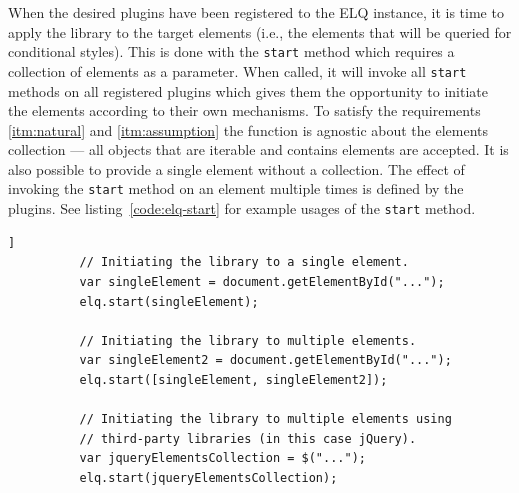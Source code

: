 \documentclass[a4paper,11pt]{kth-mag}
\newcommand{\code}[1]{\texttt{#1}}
\begin{document}
        When the desired plugins have been registered to the \gls{ELQ} instance, it is time to apply the library to the target \glspl{element} (i.e., the elements that will be queried for conditional styles).
        This is done with the \code{start} method which requires a collection of \glspl{element} as a parameter.
        When called, it will invoke all \code{start} methods on all registered plugins which gives them the opportunity to initiate the \glspl{element} according to their own mechanisms.
        To satisfy the requirements \ref{itm:natural} and \ref{itm:assumption} the function is agnostic about the \glspl{element} collection --- all objects that are iterable and contains \glspl{element} are accepted.
        It is also possible to provide a single \gls{element} without a collection.
        The effect of invoking the \code{start} method on an element multiple times is defined by the plugins.
        See listing~\ref{code:elq-start} for example usages of the \code{start} method.
        \begin{lstlisting}[gobble=10,caption={Example usages of the \code{start} method. The method only requires an iterable collection, so it is library agnostic.},captionpos=b,label={code:elq-start}]]
          // Initiating the library to a single element.
          var singleElement = document.getElementById("...");
          elq.start(singleElement);

          // Initiating the library to multiple elements.
          var singleElement2 = document.getElementById("...");
          elq.start([singleElement, singleElement2]);

          // Initiating the library to multiple elements using
          // third-party libraries (in this case jQuery).
          var jqueryElementsCollection = $("...");
          elq.start(jqueryElementsCollection);
        \end{lstlisting}
\end{document}

